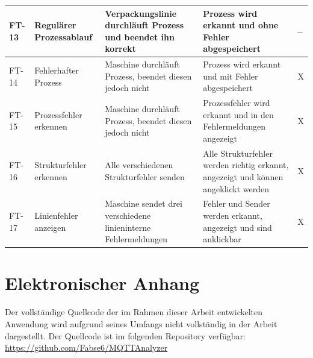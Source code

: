 \begin{longtable}{|p{1cm}|p{3cm}|p{4.0cm}|p{4.8cm}|p{2cm}|}
    \\ \hline FT-13 & Regulärer Prozessablauf & Verpackungslinie durchläuft Prozess und beendet ihn korrekt & Prozess wird erkannt und ohne Fehler abgespeichert & -- 
    \\ \hline FT-14 & Fehlerhafter Prozess & Maschine durchläuft Prozess, beendet diesen jedoch nicht & Prozess wird erkannt und mit Fehler abgespeichert & X 
    \\ \hline FT-15 & Prozessfehler erkennen & Maschine durchläuft Prozess, beendet diesen jedoch nicht & Prozessfehler wird erkannt und in den Fehlermeldungen angezeigt & X 
    \\ \hline FT-16 & Strukturfehler erkennen & Alle verschiedenen Strukturfehler senden & Alle Strukturfehler werden richtig erkannt, angezeigt und können angeklickt werden & X 
    \\ \hline FT-17 & Linienfehler anzeigen & Maschine sendet drei verschiedene linieninterne Fehlermeldungen & Fehler und Sender werden erkannt, angezeigt und sind anklickbar & X \\ \hline  
\end{longtable}

\setcounter{chapter}{3}
\setcounter{section}{0}
\setcounter{table}{0}
\setcounter{figure}{0}

\section{Elektronischer Anhang}
Der vollständige Quellcode der im Rahmen dieser Arbeit entwickelten Anwendung wird aufgrund seines Umfangs nicht vollständig in der Arbeit dargestellt. Der Quellcode ist im folgenden Repository verfügbar: \url{https://github.com/Fabse6/MQTTAnalyzer}
